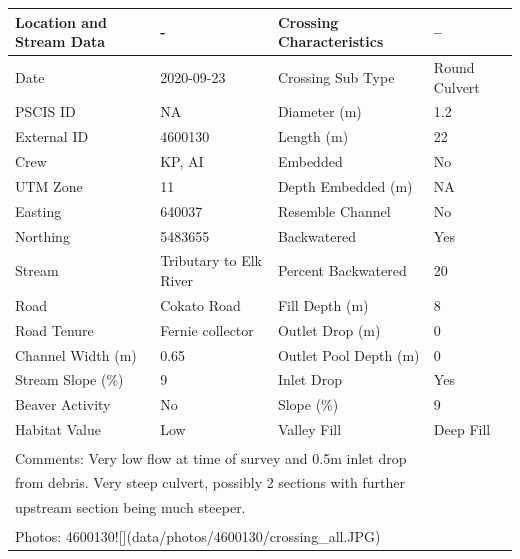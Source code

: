 \documentclass[
]{book}
\begin{document}
\begin{tabular}{l|l|l|l}
\hline
Location and Stream Data & - & Crossing Characteristics & --\\
\hline
Date & 2020-09-23 & Crossing Sub Type & Round Culvert\\
\hline
PSCIS ID & NA & Diameter (m) & 1.2\\
\hline
External ID & 4600130 & Length (m) & 22\\
\hline
Crew & KP, AI & Embedded & No\\
\hline
UTM Zone & 11 & Depth Embedded (m) & NA\\
\hline
Easting & 640037 & Resemble Channel & No\\
\hline
Northing & 5483655 & Backwatered & Yes\\
\hline
Stream & Tributary to Elk River & Percent Backwatered & 20\\
\hline
Road & Cokato Road & Fill Depth (m) & 8\\
\hline
Road Tenure & Fernie collector & Outlet Drop (m) & 0\\
\hline
Channel Width (m) & 0.65 & Outlet Pool Depth (m) & 0\\
\hline
Stream Slope (\%) & 9 & Inlet Drop & Yes\\
\hline
Beaver Activity & No & Slope (\%) & 9\\
\hline
Habitat Value & Low & Valley Fill & Deep Fill\\
\hline
\multicolumn{4}{l}{\textsuperscript{} Comments: Very low flow at time of survey and 0.5m inlet drop}\\
\multicolumn{4}{l}{from debris. Very steep culvert, possibly 2 sections with further}\\
\multicolumn{4}{l}{upstream section being much steeper.}\\
\multicolumn{4}{l}{\textsuperscript{} Photos: 4600130![](data/photos/4600130/crossing\_all.JPG)}\\
\end{tabular}
\end{document}
